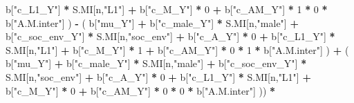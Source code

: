 \documentclass[
]{book}
\newenvironment{Shaded}{\begin{snugshade}}{\end{snugshade}}
\newcommand{\DecValTok}[1]{\textcolor[rgb]{0.00,0.00,0.81}{#1}}
\newcommand{\NormalTok}[1]{#1}
\newcommand{\SpecialCharTok}[1]{\textcolor[rgb]{0.81,0.36,0.00}{\textbf{#1}}}
\newcommand{\StringTok}[1]{\textcolor[rgb]{0.31,0.60,0.02}{#1}}
\begin{document}
\begin{Shaded}
\begin{Highlighting}[]
\NormalTok{                                b[}\StringTok{"c\_L1\_Y"}\NormalTok{] }\SpecialCharTok{*}\NormalTok{ S.MI[n,}\StringTok{"L1"}\NormalTok{] }\SpecialCharTok{+}
\NormalTok{                                b[}\StringTok{"c\_M\_Y"}\NormalTok{] }\SpecialCharTok{*} \DecValTok{0} \SpecialCharTok{+}
\NormalTok{                                b[}\StringTok{"c\_AM\_Y"}\NormalTok{] }\SpecialCharTok{*} \DecValTok{1} \SpecialCharTok{*} \DecValTok{0} \SpecialCharTok{*}\NormalTok{ b[}\StringTok{"A.M.inter"}\NormalTok{] ) }\SpecialCharTok{{-}} 
\NormalTok{                            ( b[}\StringTok{"mu\_Y"}\NormalTok{] }\SpecialCharTok{+} 
\NormalTok{                                b[}\StringTok{"c\_male\_Y"}\NormalTok{] }\SpecialCharTok{*}\NormalTok{ S.MI[n,}\StringTok{"male"}\NormalTok{] }\SpecialCharTok{+} 
\NormalTok{                                b[}\StringTok{"c\_soc\_env\_Y"}\NormalTok{] }\SpecialCharTok{*}\NormalTok{ S.MI[n,}\StringTok{"soc\_env"}\NormalTok{] }\SpecialCharTok{+} 
\NormalTok{                                b[}\StringTok{"c\_A\_Y"}\NormalTok{] }\SpecialCharTok{*} \DecValTok{0} \SpecialCharTok{+} 
\NormalTok{                                b[}\StringTok{"c\_L1\_Y"}\NormalTok{] }\SpecialCharTok{*}\NormalTok{ S.MI[n,}\StringTok{"L1"}\NormalTok{] }\SpecialCharTok{+}
\NormalTok{                                b[}\StringTok{"c\_M\_Y"}\NormalTok{] }\SpecialCharTok{*} \DecValTok{1} \SpecialCharTok{+}
\NormalTok{                                b[}\StringTok{"c\_AM\_Y"}\NormalTok{] }\SpecialCharTok{*} \DecValTok{0} \SpecialCharTok{*} \DecValTok{1} \SpecialCharTok{*}\NormalTok{ b[}\StringTok{"A.M.inter"}\NormalTok{] ) }\SpecialCharTok{+} 
\NormalTok{                            ( b[}\StringTok{"mu\_Y"}\NormalTok{] }\SpecialCharTok{+} 
\NormalTok{                                b[}\StringTok{"c\_male\_Y"}\NormalTok{] }\SpecialCharTok{*}\NormalTok{ S.MI[n,}\StringTok{"male"}\NormalTok{] }\SpecialCharTok{+} 
\NormalTok{                                b[}\StringTok{"c\_soc\_env\_Y"}\NormalTok{] }\SpecialCharTok{*}\NormalTok{ S.MI[n,}\StringTok{"soc\_env"}\NormalTok{] }\SpecialCharTok{+} 
\NormalTok{                                b[}\StringTok{"c\_A\_Y"}\NormalTok{] }\SpecialCharTok{*} \DecValTok{0} \SpecialCharTok{+} 
\NormalTok{                                b[}\StringTok{"c\_L1\_Y"}\NormalTok{] }\SpecialCharTok{*}\NormalTok{ S.MI[n,}\StringTok{"L1"}\NormalTok{] }\SpecialCharTok{+}
\NormalTok{                                b[}\StringTok{"c\_M\_Y"}\NormalTok{] }\SpecialCharTok{*} \DecValTok{0} \SpecialCharTok{+}
\NormalTok{                                b[}\StringTok{"c\_AM\_Y"}\NormalTok{] }\SpecialCharTok{*} \DecValTok{0} \SpecialCharTok{*} \DecValTok{0} \SpecialCharTok{*}\NormalTok{ b[}\StringTok{"A.M.inter"}\NormalTok{] )) }\SpecialCharTok{*}

\end{Highlighting}
\end{Shaded}
\end{document}
